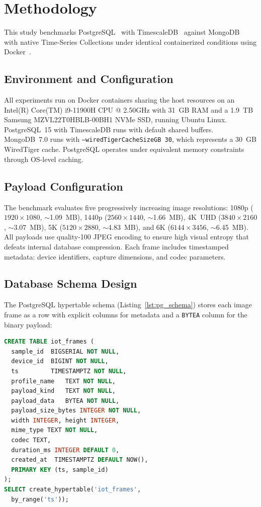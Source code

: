 \documentclass[conference, a4paper]{IEEEtran}
\begin{document}
\section{Methodology}
\label{sec:methodology}

This study benchmarks PostgreSQL~\cite{postgresql_official} with TimescaleDB~\cite{timescaledb_official} against MongoDB~\cite{mongodb_official} with native Time-Series Collections under identical containerized conditions using Docker~\cite{docker_official}.

\subsection{Environment and Configuration}
All experiments run on Docker containers sharing the host resources on an Intel(R) Core(TM) i9-11900H CPU @ 2.50GHz with 31~GB RAM and a 1.9~TB Samsung MZVL22T0HBLB-00BH1 NVMe SSD, running Ubuntu Linux. PostgreSQL~15 with TimescaleDB runs with default shared buffers. MongoDB~7.0 runs with \texttt{--wiredTigerCacheSizeGB~30}, which represents a 30~GB WiredTiger cache. PostgreSQL operates under equivalent memory constraints through OS-level caching.

\subsection{Payload Configuration}
The benchmark evaluates five progressively increasing image resolutions: 1080p ($1920{\times}1080$, $\sim$1.09~MB), 1440p ($2560{\times}1440$, $\sim$1.66~MB), 4K~UHD ($3840{\times}2160$, $\sim$3.07~MB), 5K ($5120{\times}2880$, $\sim$4.83~MB), and 6K ($6144{\times}3456$, $\sim$6.45~MB). All payloads use quality-100 JPEG encoding to ensure high visual entropy that defeats internal database compression. Each frame includes timestamped metadata: device identifiers, capture dimensions, and codec parameters.

\subsection{Database Schema Design}
The PostgreSQL hypertable schema (Listing~\ref{lst:pg_schema}) stores each image frame as a row with explicit columns for metadata and a \texttt{BYTEA} column for the binary payload:

\begin{lstlisting}[language=SQL,basicstyle=\ttfamily\scriptsize,breaklines=true,caption={PostgreSQL (TimescaleDB) table schema.},label={lst:pg_schema}]
CREATE TABLE iot_frames (
  sample_id  BIGSERIAL NOT NULL,
  device_id  BIGINT NOT NULL,
  ts         TIMESTAMPTZ NOT NULL,
  profile_name   TEXT NOT NULL,
  payload_kind   TEXT NOT NULL,
  payload_data   BYTEA NOT NULL,
  payload_size_bytes INTEGER NOT NULL,
  width INTEGER, height INTEGER,
  mime_type TEXT NOT NULL,
  codec TEXT,
  duration_ms INTEGER DEFAULT 0,
  created_at  TIMESTAMPTZ DEFAULT NOW(),
  PRIMARY KEY (ts, sample_id)
);
SELECT create_hypertable('iot_frames',
  by_range('ts'));
\end{lstlisting}
\end{document}
